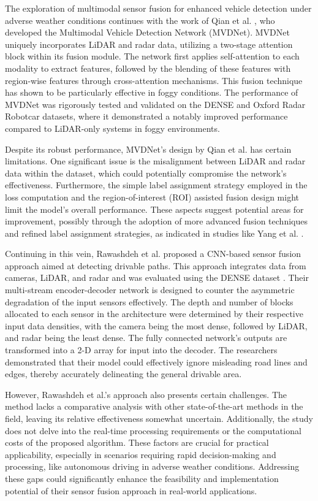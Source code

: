 \documentclass[report.tex]{subfiles}
\begin{document}
    The exploration of multimodal sensor fusion for enhanced vehicle detection under adverse weather conditions continues with the work of Qian et al. \cite{qian2021robust}, who developed the Multimodal Vehicle Detection Network (MVDNet). MVDNet uniquely incorporates LiDAR and radar data, utilizing a two-stage attention block within its fusion module. The network first applies self-attention to each modality to extract features, followed by the blending of these features with region-wise features through cross-attention mechanisms. This fusion technique has shown to be particularly effective in foggy conditions. The performance of MVDNet was rigorously tested and validated on the DENSE \cite{bijelic2020seeing} and Oxford Radar Robotcar \cite{barnes2020oxford} datasets, where it demonstrated a notably improved performance compared to LiDAR-only systems in foggy environments.

    Despite its robust performance, MVDNet's design by Qian et al. \cite{qian2021robust} has certain limitations. One significant issue is the misalignment between LiDAR and radar data within the dataset, which could potentially compromise the network's effectiveness. Furthermore, the simple label assignment strategy employed in the loss computation and the region-of-interest (ROI) assisted fusion design might limit the model's overall performance. These aspects suggest potential areas for improvement, possibly through the adoption of more advanced fusion techniques and refined label assignment strategies, as indicated in studies like Yang et al. \cite{yang2022ralibev}.

    Continuing in this vein, Rawashdeh et al. \cite{rawashdeh2021drivable} proposed a CNN-based sensor fusion approach aimed at detecting drivable paths. This approach integrates data from cameras, LiDAR, and radar and was evaluated using the DENSE dataset \cite{bijelic2020seeing}. Their multi-stream encoder-decoder network is designed to counter the asymmetric degradation of the input sensors effectively. The depth and number of blocks allocated to each sensor in the architecture were determined by their respective input data densities, with the camera being the most dense, followed by LiDAR, and radar being the least dense. The fully connected network's outputs are transformed into a 2-D array for input into the decoder. The researchers demonstrated that their model could effectively ignore misleading road lines and edges, thereby accurately delineating the general drivable area.

    However, Rawashdeh et al.'s approach \cite{rawashdeh2021drivable} also presents certain challenges. The method lacks a comparative analysis with other state-of-the-art methods in the field, leaving its relative effectiveness somewhat uncertain. Additionally, the study does not delve into the real-time processing requirements or the computational costs of the proposed algorithm. These factors are crucial for practical applicability, especially in scenarios requiring rapid decision-making and processing, like autonomous driving in adverse weather conditions. Addressing these gaps could significantly enhance the feasibility and implementation potential of their sensor fusion approach in real-world applications.
\end{document}
